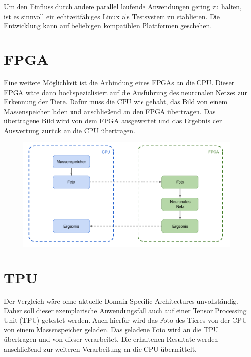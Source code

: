 Um den Einfluss durch andere parallel laufende Anwendungen gering zu halten, ist es sinnvoll ein echtzeitfähiges Linux als Testsystem zu etablieren. Die Entwicklung kann auf beliebigen kompatiblen Plattformen geschehen.

\newpage


\section{FPGA}

Eine weitere Möglichkeit ist die Anbindung eines FPGAs an die CPU. Dieser FPGA wäre dann hochspezialisiert auf die Ausführung des neuronalen Netzes zur Erkennung der Tiere. Dafür muss die CPU wie gehabt, das Bild von einem Massenspeicher laden und anschließend an den FPGA übertragen. Das übertragene Bild wird von dem FPGA ausgewertet und das Ergebnis der Auswertung zurück an die CPU übertragen. 

\begin{figure}[htbp]
	\centering
		\includegraphics[width=1.00\textwidth]{BilderPDF/zielsetzung/System-FPGA.png}
	\label{fig:System-FPGA}
\end{figure}

\newpage


\section{TPU}

Der Vergleich wäre ohne aktuelle Domain Specific Architectures unvollständig. Daher soll dieser exemplarische Anwendungsfall auch auf einer Tensor Processing Unit (TPU) getestet werden. Auch hierfür wird das Foto des Tieres von der CPU von einem Massenspeicher geladen. Das geladene Foto wird an die TPU übertragen und von dieser verarbeitet. Die erhaltenen Resultate werden anschließend zur weiteren Verarbeitung an die CPU übermittelt.

